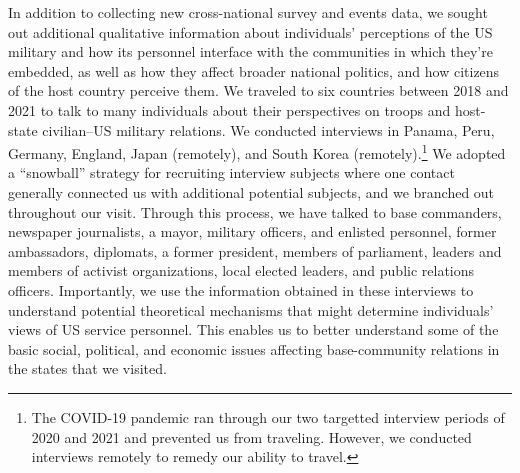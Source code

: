 In addition to collecting new cross-national survey and events data, we sought out additional qualitative information about individuals' perceptions of the US military and how its personnel interface with the communities in which they're embedded, as well as how they affect broader national politics, and how citizens of the host country perceive them. We traveled to six countries between 2018 and 2021 to talk to many individuals about their perspectives on troops and host-state civilian--US military relations. We conducted interviews in Panama, Peru, Germany, England, Japan (remotely), and South Korea (remotely).\footnote{The COVID-19 pandemic ran through our two targetted interview periods of 2020 and 2021 and prevented us from traveling. However, we conducted interviews remotely to remedy our ability to travel.} We adopted a ``snowball'' strategy for recruiting interview subjects where one contact generally connected us with additional potential subjects, and we branched out throughout our visit. Through this process, we have talked to base commanders, newspaper journalists, a mayor, military officers, and enlisted personnel, former ambassadors, diplomats, a former president, members of parliament, leaders and members of activist organizations, local elected leaders, and public relations officers. Importantly, we use the information obtained in these interviews to understand potential theoretical mechanisms that might determine individuals' views of US service personnel. This enables us to better understand some of the basic social, political, and economic issues affecting base-community relations in the states that we visited. 

